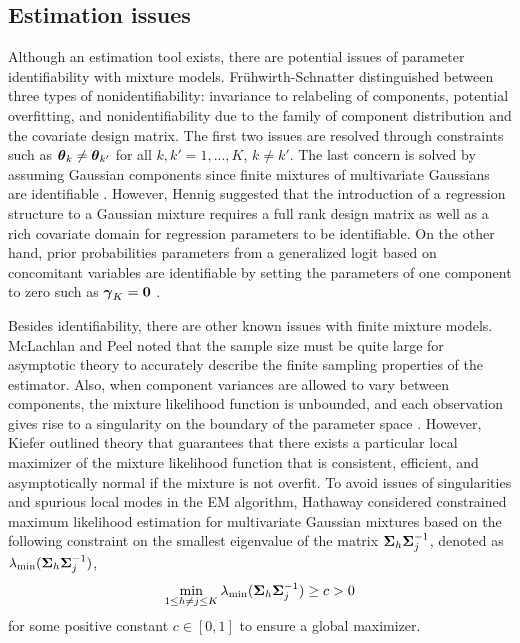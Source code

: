 \subsection{Estimation issues}
Although an estimation tool exists, there are potential issues of parameter identifiability with mixture models. Fr{\"u}hwirth-Schnatter \cite{fruhwirth2006} distinguished between three types of nonidentifiability: invariance to  relabeling of components, potential overfitting, and nonidentifiability due to the family of component distribution and the covariate design matrix. The first two issues are resolved through constraints such as $\boldsymbol\theta_{k}\not=\boldsymbol\theta_{k'}$ for all $k,k'=1,...,K$, $k\not=k'$. The last concern is solved by assuming Gaussian components since finite mixtures of multivariate Gaussians are identifiable \cite{teicher1963,yakowitz1968}. However, Hennig \cite{hennig2000} suggested that the introduction of a regression structure to a Gaussian mixture requires a full rank design matrix as well as a rich covariate domain for regression parameters to be identifiable. On the other hand, prior probabilities parameters from a generalized logit based on concomitant variables are identifiable by setting the parameters of one component to zero such as $\boldsymbol\gamma_{K}=\boldsymbol0$ \cite{jiang1999}.

Besides identifiability, there are other known issues with finite mixture models. McLachlan and Peel \cite{mclachlan2000} noted that the sample size must be quite large for asymptotic theory to accurately describe the finite sampling properties of the estimator. Also, when component variances are allowed to vary between components, the mixture likelihood function is unbounded, and each observation gives rise to a singularity on the boundary of the parameter space \cite{day1969,kiefer1956}. However, Kiefer \cite{kiefer1978} outlined theory that guarantees that there exists a particular local maximizer of the mixture likelihood function that is consistent, efficient, and asymptotically normal if the mixture is not overfit. To avoid issues of singularities and spurious local modes in the EM algorithm, Hathaway \cite{hathaway1985} considered constrained maximum likelihood estimation for multivariate Gaussian mixtures based on the following constraint on the smallest eigenvalue of the matrix $\boldsymbol\Sigma_{h}\boldsymbol\Sigma_{j}^{-1}$, denoted as $\lambda_{\text{min}}(\boldsymbol\Sigma_{h}\boldsymbol\Sigma_{j}^{-1})$,
$$\min_{1\leq h\not=j\leq K}\lambda_{\text{min}}(\boldsymbol\Sigma_{h}\boldsymbol\Sigma_{j}^{-1})\geq c > 0$$ for some positive constant $c\in[0,1]$ to ensure a global maximizer. 



